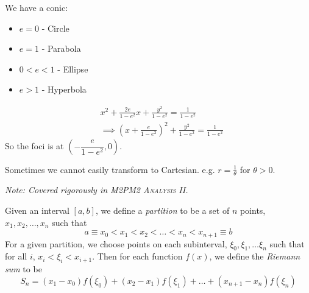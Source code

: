\documentclass[10pt]{scrartcl}
\begin{document}
\begin{example}
\begin{itemize}
We have a conic: 
\begin{itemize}
  \item $e = 0$ - Circle
  \item $e = 1$ - Parabola
  \item $0 < e < 1$ - Ellipse
  \item $e > 1$ - Hyperbola
\end{itemize}

\[
\begin{aligned}
  &x^2 + \frac{2e}{1-e^2}x + \frac{y^2}{1-e^2} = \frac{1}{1-e^2}\\
  &\implies \left(x + \frac{e}{1-e^2}\right)^2 +  \frac{y^2}{1-e^2} = \frac{1}{1-e^2}
\end{aligned}
\]
So the foci is at $\left(-\dfrac{e}{1-e^2},0\right)$.   
\end{itemize}
\end{example}\vspace*{5pt}

Sometimes we cannot easily transform to Cartesian. e.g. $r = \frac{1}{\theta}$ for $\theta >0$. 







\emph{Note: Covered rigorously in \textsc{M2PM2 Analysis II}.}\\

\begin{definition} 
Given an interval $[a,b]$, we define a \emph{partition} to be a set of $n$ points, $x_1,x_2,\dots,x_n$ such that 
\[a \equiv x_0 < x_1 < x_2 < \dots < x_n < x_{n+1} \equiv b\]	
For a given partition, we choose points on each subinterval, $\xi_0, \xi_1,\dots \xi_n$ such that for all $i$, $x_i < \xi_i < x_{i+1}$. Then for each function $f(x)$, we define the \emph{Riemann sum} to be
\[S_n = (x_1 - x_0)f(\xi_0) + (x_2 - x_1)f(\xi_1) + \dots + (x_{n+1}-x_n)f(\xi_n)\]

\end{definition}
\end{document}
